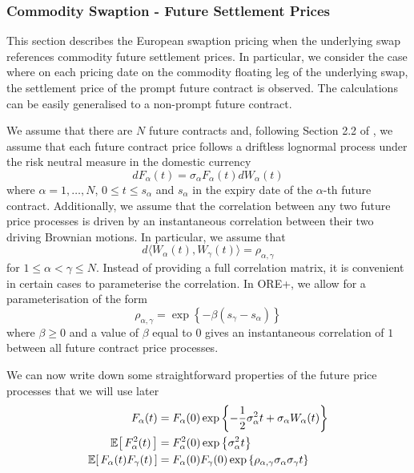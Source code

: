 \subsubsection{Commodity Swaption - Future Settlement Prices}
\label{pricing:com_swaption_future_settlement_prices}

This section describes the European swaption pricing when the underlying swap references commodity future settlement prices. In particular, we consider the case where on each pricing date on the commodity floating leg of the underlying swap, the settlement price of the prompt future contract is observed. The calculations can be easily generalised to a non-prompt future contract.

We assume that there are $N$ future contracts and, following Section 2.2 of \cite{Clark_2014}, we assume that each future contract price follows a driftless lognormal process under the risk neutral measure in the domestic currency
\begin{equation}
\label{eq:comm_future_price_processes}
dF_{\alpha}(t) = \sigma_{\alpha} F_{\alpha}(t) dW_{\alpha}(t)
\end{equation}
where $\alpha = 1, \ldots, N$, $0 \leq t \leq s_{\alpha}$ and $s_{\alpha}$ in the expiry date of the $\alpha$-th future contract. Additionally, we assume that the correlation between any two future price processes is driven by an instantaneous correlation between their two driving Brownian motions. In particular, we assume that
\begin{equation}
d \langle W_{\alpha}(t), W_{\gamma}(t) \rangle = \rho_{\alpha, \gamma}
\end{equation}
for $1 \leq \alpha < \gamma \leq N$. Instead of providing a full correlation matrix, it is convenient in certain cases to parameterise the correlation. In ORE+, we allow for a parameterisation of the form
\begin{equation}
\rho_{\alpha, \gamma} = \exp \left\{ -\beta \left( s_{\gamma} - s_{\alpha} \right) \right\}
\end{equation}
where $\beta \geq 0$ and a value of $\beta$ equal to $0$ gives an instantaneous correlation of $1$ between all future contract price processes.

We can now write down some straightforward properties of the future price processes that we will use later
\begingroup
\addtolength{\jot}{0.5em}
\begin{align}
F_{\alpha}(t) &= F_{\alpha}(0) \exp \left\{ - \frac{1}{2} \sigma^2_{\alpha} t + \sigma_{\alpha} W_{\alpha}(t) \right\} \\
\Ex{F^2_{\alpha}(t)} &= F^2_{\alpha}(0) \exp \left\{ \sigma^2_{\alpha} t \right\} \label{eq:future_second_moment} \\
\Ex{F_{\alpha}(t)F_{\gamma}(t)} &= F_{\alpha}(0) F_{\gamma}(0) \exp \left\{ \rho_{\alpha, \gamma} \sigma_{\alpha} \sigma_{\gamma} t \right\} \label{eq:future_exp_product}
\end{align}
\endgroup

